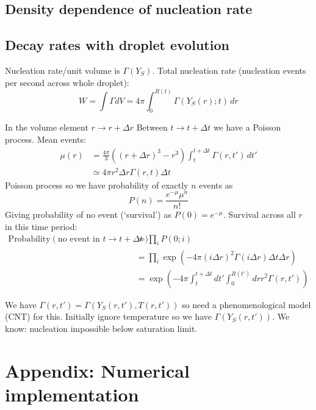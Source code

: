 \documentclass[12pt,twoside]{report}
\begin{document}
\subsection{Density dependence of nucleation rate}
\subsection{Decay rates with droplet evolution}

Nucleation rate/unit volume is $\Gamma(Y_S)$.
Total nucleation rate (nucleation events per second across whole droplet):
\begin{equation}
  W = \int \Gamma dV
  = 4\pi \int_0^{R(t)} \Gamma(Y_S(r); t) \, dr
\end{equation}

In the volume element $r \to r + \Delta r$ Between $t \to t+\Delta t$ we have a Poisson process.
Mean events:
\begin{equation}
  \begin{aligned}
    \mu(r) &= \frac{4\pi}{3} ( (r+\Delta r)^3 - r^3)
    \int_t^{t+\Delta t} \Gamma(r,t') \, dt' \\
    &\simeq
    4\pi r^2 \Delta r \Gamma(r, t) \Delta t
  \end{aligned}
\end{equation}
Poisson process so we have probability of exactly $n$ events as
\begin{equation}
  P(n) = \frac{e^{-\mu} \mu^n}{n!}
\end{equation}
Giving probability of no event (`survival') as $P(0) = e^{-\mu}$.
Survival across all $r$ in this time period:
\begin{equation}
  \begin{aligned}
  \textrm{Probability}\left( \textrm{no event in } t \to t + \Delta t \right)
  &= \prod_i P(0;i) \\
  &= \prod_i \exp{\left(-4\pi (i\Delta r)^2 \Gamma(i\Delta r) \Delta t \Delta r\right)} \\
  &= \exp{\left(
    -4\pi \int_t^{t+\Delta t} dt' \int_0^{R(t')} dr r^2 \Gamma(r, t')
    \right)}
  \end{aligned}
\end{equation}

We have $\Gamma(r,t') = \Gamma(Y_S(r,t'), T(r,t'))$ so need a phenomenological model (CNT) for this.
Initially ignore temperature so we have $\Gamma(Y_S(r,t'))$.
We know: nucleation impossible below saturation limit.

\section*{Appendix: Numerical implementation}
\end{document}
